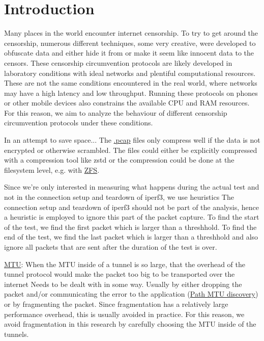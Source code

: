 
\chapter{Introduction}


Many places in the world encounter internet censorship. To try to get around the censorship, numerous different techniques, some very creative, were developed to obfuscate data and either hide it from or make it seem like innocent data to the censors. These censorship circumvention protocols are likely developed in laboratory conditions with ideal networks and plentiful computational resources. These are not the same conditions encountered in the real world, where networks may have a high latency and low throughput. Running these protocols on phones or other mobile devices also constrains the available CPU and RAM resources. For this reason, we aim to analyze the behaviour of different censorship circumvention protocols under these conditions.



In an attempt to save space...
The \href{https://en.wikipedia.org/wiki/Pcap}{.pcap} files only compress well if the data is not encrypted or otherwise scrambled.
The files could either be explicitly compressed with a compression tool like zstd or the compression could be done at the filesystem level, e.g. with \href{https://openzfs.org/wiki/Main_Page}{ZFS}.


Since we're only interested in measuring what happens during the actual test and not in the connection setup and teardown of iperf3, we use heuristics
The connection setup and teardown of iperf3 should not be part of the analysis, hence a heuristic is employed to ignore this part of the packet capture. To find the start of the test, we find the first packet which is larger than a threshhold. To find the end of the test, we find the last packet which is larger than a threshhold and also ignore all packets that are sent after the duration of the test is over.

\href{https://en.wikipedia.org/wiki/Maximum_transmission_unit}{MTU}:
When the MTU inside of a tunnel is so large, that the overhead of the tunnel protocol would make the packet too big to be transported over the internet
Needs to be dealt with in some way. Usually by either dropping the packet and/or communicating the error to the application (\href{https://en.wikipedia.org/wiki/Path_MTU_Discovery}{Path MTU discovery}) or by fragmenting the packet. Since fragmentation has a relatively large performance overhead, this is usually avoided in practice. For this reason, we avoid fragmentation in this research by carefully choosing the MTU inside of the tunnels.

